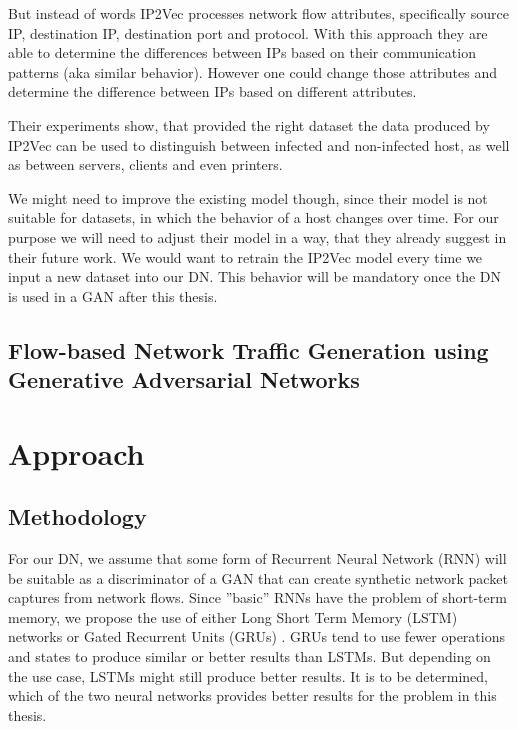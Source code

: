 \documentclass[
	ngerman,
	ruledheaders=section,%
	class=report,%
	thesis={type=bachelor},%
	accentcolor=9c,%
	custommargins=true,%
	marginpar=false,%
	parskip=half-,%
	fontsize=11pt,%
]{tudapub}
\begin{document}
But instead of words IP2Vec processes network flow attributes,
specifically source IP, destination IP, destination port and protocol.
With this approach they are able to determine the differences between IPs based on their communication patterns (aka similar behavior).
However one could change those attributes and determine the difference between IPs based on different attributes.

Their experiments show, that provided the right dataset the data produced by IP2Vec can be used to distinguish between infected and non-infected host, as well as between servers, clients and even printers.

We might need to improve the existing model though, since their model is not suitable for datasets, in which the behavior of a host changes over time.
For our purpose we will need to adjust their model in a way, that they already suggest in their future work.
We would want to retrain the IP2Vec model every time we input a new dataset into our DN.
This behavior will be mandatory once the DN is used in a GAN after this thesis.

\section{Flow-based Network Traffic Generation using Generative Adversarial Networks}



\chapter{Approach}

\section{Methodology}

For our DN, we assume that some form of Recurrent Neural Network (RNN) will be suitable as a discriminator of a GAN that can create synthetic network packet captures from network flows.
Since ''basic'' RNNs have the problem of short-term memory, we propose the use of either Long Short Term Memory (LSTM) networks \cite{hochreiterLongShortTermMemory1997} or Gated Recurrent Units (GRUs) \cite{bahdanauNeuralMachineTranslation2016}.
GRUs tend to use fewer operations and states to produce similar or better results than LSTMs.
But depending on the use case, LSTMs might still produce better results.
It is to be determined, which of the two neural networks provides better results for the problem in this thesis.
\end{document}
